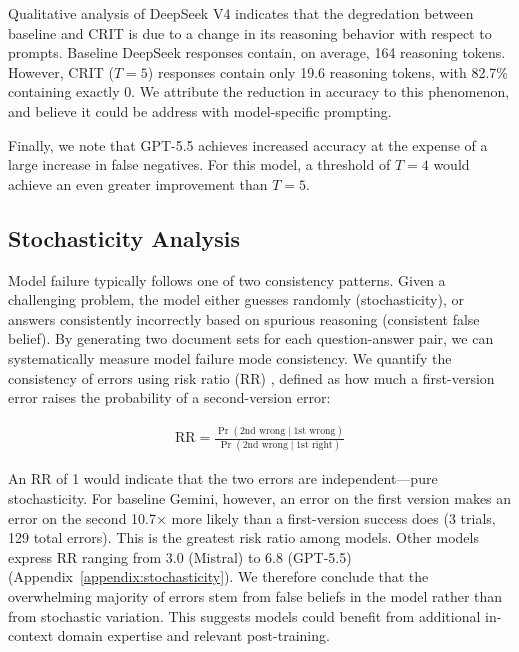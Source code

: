 \documentclass[11pt]{article}
\begin{document}
Qualitative analysis of DeepSeek V4 indicates that the degredation between baseline and CRIT is due to a change in its reasoning behavior with respect to prompts.
Baseline DeepSeek responses contain, on average, 164 reasoning tokens. 
However, CRIT ($T=5$) responses contain only 19.6 reasoning tokens, with 82.7\% containing exactly 0.
We attribute the reduction in accuracy to this phenomenon, and believe it could be address with model-specific prompting.

Finally, we note that GPT-5.5 achieves increased accuracy at the expense of a large increase in false negatives. 
For this model, a threshold of $T=4$ would achieve an even greater improvement than $T=5$.


\subsection{Stochasticity Analysis}
\label{sec:stochasticity}


Model failure typically follows one of two consistency patterns. 
Given a challenging problem, the model either guesses randomly (stochasticity), or answers consistently incorrectly based on spurious reasoning (consistent false belief).
By generating two document sets for each question-answer pair, we can systematically measure model failure mode consistency.
We quantify the consistency of errors using risk ratio (RR) \citep{rothman2008modern}, defined as how much a first-version error raises the probability of a second-version error:

\begin{align*}
\mathrm{RR} = \frac{\Pr(\text{2nd wrong}\mid\text{1st wrong})}{\Pr(\text{2nd wrong}\mid\text{1st right})}
\end{align*}

\noindent An RR of 1 would indicate that the two errors are independent—pure stochasticity. For baseline Gemini, however, an error on the first version makes an error on the second 10.7× more likely than a first-version success does (3 trials, 129 total errors). 
This is the greatest risk ratio among models. 
Other models express RR ranging from 3.0 (Mistral) to 6.8 (GPT-5.5) (Appendix~\ref{appendix:stochasticity}).
We therefore conclude that the overwhelming majority of errors stem from false beliefs in the model rather than from stochastic variation. 
This suggests models could benefit from additional in-context domain expertise and relevant post-training.
\end{document}
